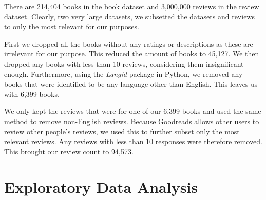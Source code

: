 \documentclass[12pt]{article}
\numberwithin{equation}{section}
\begin{document}
There are 214,404 books in the book dataset and 3,000,000 reviews in the review dataset. Clearly, two very large datasets, we subsetted the datasets and reviews to only the most relevant for our purposes.

First we dropped all the books without any ratings or descriptions as these are irrelevant for our purpose. This reduced the amount of books to 45,127. We then dropped any books with less than 10 reviews, considering them insignificant enough. Furthermore, using the \textit{Langid} package in Python, we removed any books that were identified to be any language other than English. This leaves us with 6,399 books.

We only kept the reviews that were for one of our 6,399 books and used the same method to remove non-English reviews. Because Goodreads allows other users to review other people's reviews, we used this to further subset only the most relevant reviews. Any reviews with less than 10 responses were therefore removed. This brought our review count to 94,573.

\section{Exploratory Data Analysis}
\end{document}
